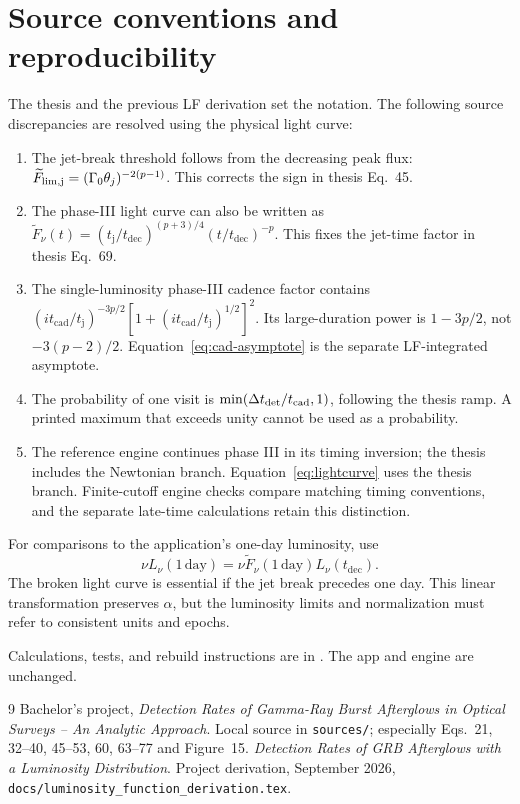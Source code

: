 \documentclass[11pt,a4paper]{article}
\newcommand{\tcad}{t_{\mathrm{cad}}}
\newcommand{\tdec}{t_{\mathrm{dec}}}
\newcommand{\tj}{t_{\mathrm j}}
\newcommand{\ft}{\widetilde F_\nu}
\begin{document}
\section{Source conventions and reproducibility}
The thesis and the previous LF derivation set the notation. The following
source discrepancies are resolved using the physical light curve:
\begin{enumerate}
\item The jet-break threshold follows from the decreasing peak flux:
$\widetilde F_{\rm lim,j}=(\Gamma_0\theta_j)^{-2(p-1)}$.
This corrects the sign in thesis Eq.~45.
\item The phase-III light curve can also be written as
$\ft(t)=(\tj/\tdec)^{(p+3)/4}(t/\tdec)^{-p}$.
This fixes the jet-time factor in thesis Eq.~69.
\item The single-luminosity phase-III cadence factor contains
$(i\tcad/\tj)^{-3p/2}[1+(i\tcad/\tj)^{1/2}]^2$.
Its large-duration power is $1-3p/2$, not $-3(p-2)/2$.
Equation~\eqref{eq:cad-asymptote} is the separate LF-integrated asymptote.
\item The probability of one visit is
$\min(\Delta t_{\rm det}/\tcad,1)$, following the thesis ramp.
A printed maximum that exceeds unity cannot be used as a probability.
\item The reference engine continues phase III in its timing inversion;
the thesis includes the Newtonian branch. Equation~\eqref{eq:lightcurve}
uses the thesis branch. Finite-cutoff engine checks compare matching timing
conventions, and the separate late-time calculations retain this distinction.
\end{enumerate}

For comparisons to the application's one-day luminosity, use
\begin{equation}
 \nu L_\nu(1\,\mathrm{day})=\nu\ft(1\,\mathrm{day})L_\nu(\tdec).
 \label{eq:oneday}
\end{equation}
The broken light curve is essential if the jet break precedes one day.
This linear transformation preserves $\alpha$, but the luminosity limits
and normalization must refer to consistent units and epochs.

Calculations, tests, and rebuild instructions are in
. The app and engine are unchanged.

\begingroup\small
\begin{thebibliography}{9}
 Bachelor's project, \emph{Detection Rates of Gamma-Ray Burst
Afterglows in Optical Surveys -- An Analytic Approach}. Local source in
\texttt{sources/}; especially Eqs.~21, 32--40, 45--53, 60, 63--77 and Figure~15.
 \emph{Detection Rates of GRB Afterglows with a Luminosity
Distribution}. Project derivation, September 2026,
\texttt{docs/luminosity\_function\_derivation.tex}.
\end{thebibliography}
\endgroup
\end{document}
